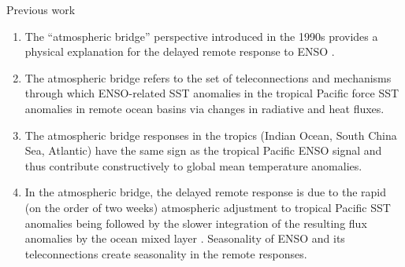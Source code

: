 \documentclass[aspectratio=169,xcolor=dvipsnames]{beamer}
\begin{document}
\begin{frame}[allowframebreaks]{Previous work}
\begin{enumerate}
  \end{enumerate}
  \newpage
 
  \begin{enumerate}

  \item The ``atmospheric bridge'' perspective introduced in the 1990s
    provides a physical explanation for the delayed remote response to
    ENSO \citep[see][ for a review]{Alexander2002atmospheric}.
  \item The atmospheric bridge refers to the set of teleconnections
    and mechanisms through which ENSO-related SST anomalies in the
    tropical Pacific force SST anomalies in remote ocean basins via
    changes in radiative and heat fluxes.

  \item The atmospheric bridge responses in the tropics (Indian Ocean,
    South China Sea, Atlantic) have the same sign as the tropical
    Pacific ENSO signal and thus contribute constructively to global
    mean temperature anomalies.

  \item In the atmospheric bridge, the delayed remote response is due
    to the rapid (on the order of two weeks) atmospheric adjustment to
    tropical Pacific SST anomalies being followed by the slower
    integration of the resulting flux anomalies by the ocean mixed
    layer \citep{Klein1999remote}. Seasonality of ENSO and its
    teleconnections create seasonality in the remote responses.
    



\end{enumerate}
\end{frame}
\end{document}
